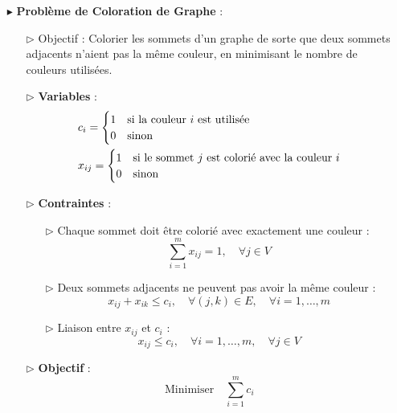 \documentclass{report}
\begin{document}
\begin{multicols*}{2}
\begin{itemize}
    \item[$\blacktriangleright$] \textbf{Problème de Coloration de Graphe} :
    \begin{itemize}
        \item[$\rhd$] Objectif : Colorier les sommets d'un graphe de sorte que deux sommets adjacents n'aient pas la même couleur, en minimisant le nombre de couleurs utilisées.
        \item[$\rhd$] \textbf{Variables} :
        \begin{align*}
            & c_i =
            \begin{cases}
            1 & \text{si la couleur \( i \) est utilisée} \\
            0 & \text{sinon}
            \end{cases} \\
            & x_{ij} =
            \begin{cases}
            1 & \text{si le sommet \( j \) est colorié avec la couleur \( i \)} \\
            0 & \text{sinon}
            \end{cases}
        \end{align*}
        \item[$\rhd$] \textbf{Contraintes} :
        \begin{itemize}
            \item[$\rhd$] Chaque sommet doit être colorié avec exactement une couleur :
            \[
            \sum_{i=1}^{m} x_{ij} = 1, \quad \forall j \in V
            \]
            \item[$\rhd$] Deux sommets adjacents ne peuvent pas avoir la même couleur :
            \[
            x_{ij} + x_{ik} \leq c_i, \quad \forall (j,k) \in E, \quad \forall i = 1,\dots,m
            \]
            \item[$\rhd$] Liaison entre \( x_{ij} \) et \( c_i \) :
            \[
            x_{ij} \leq c_i, \quad \forall i = 1,\dots,m, \quad \forall j \in V
            \]
        \end{itemize}
        \item[$\rhd$] \textbf{Objectif} :
        \[
        \text{Minimiser} \quad \sum_{i=1}^{m} c_i
        \]
    \end{itemize}


\end{itemize}
\end{multicols*}
\end{document}
